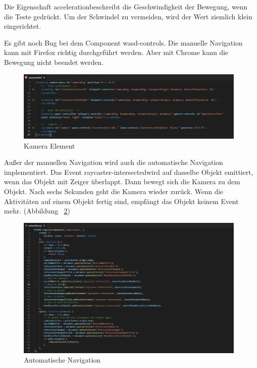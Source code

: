   Die Eigenschaft \glqq acceleration\grqq beschreibt die Geschwindigkeit der Bewegung, wenn die Teste gedrückt. Um der Schwindel zu vermeiden, wird der Wert ziemlich klein eingerichtet.
  
  Es gibt noch Bug bei dem Component \glqq wasd-controls\grqq. Die manuelle Navigation kann mit Firefox richtig durchgeführt werden. Aber mit Chrome kann die Bewegung nicht beendet werden.
  
\begin{figure}[ht]
\vspace*{0.3cm}
\centering
\includegraphics[width=\textwidth]{images/cameraHtml.png}
\caption[Kamera Element]{Kamera Element}
\label{fig:cameraHtml} 
\end{figure}
  
  Außer der manuellen Navigation wird auch die automatische Navigation implementiert. Das Event \glqq raycaster-intersected\grqq wird auf dasselbe Objekt emittiert, wenn das Objekt mit Zeiger überlappt. Dann bewegt sich die Kamera zu dem Objekt. Nach sechs Sekunden geht die Kamera wieder zurück. Wenn die Aktivitäten auf einem Objekt fertig sind, empfängt das Objekt keinem Event mehr. (Abbildung ~\ref{fig:cameraMove})
  
\begin{figure}[ht]
\vspace*{0.3cm}
\centering
\includegraphics[width=\textwidth]{images/cameraMove.png}
\caption[Automatische Navigation]{Automatische Navigation}
\label{fig:cameraMove} 
\end{figure}
  
